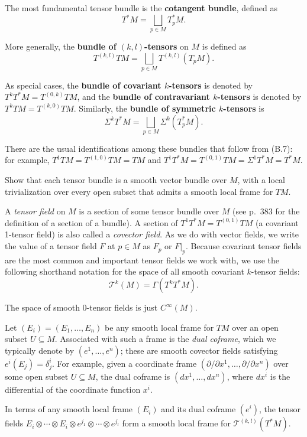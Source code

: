 The most fundamental tensor bundle is the \textbf{cotangent bundle}, defined as
\[
T^* M = \bigsqcup_{p \in M} T_p^* M.
\]

More generally, the \textbf{bundle of $(k,l)$-tensors} on $M$ is defined as
\[
T^{(k,l)} TM = \bigsqcup_{p \in M} T^{(k,l)}(T_p M).
\]

As special cases, the \textbf{bundle of covariant $k$-tensors} is denoted by $T^k T^* M = T^{(0,k)} TM$, and the \textbf{bundle of contravariant $k$-tensors} is denoted by $T^k TM = T^{(k,0)} TM$. Similarly, the \textbf{bundle of symmetric $k$-tensors} is
\[
\Sigma^k T^* M = \bigsqcup_{p \in M} \Sigma^k(T_p^* M).
\]

There are the usual identifications among these bundles that follow from (B.7): for example, $T^1 T M = T^{(1,0)} T M = T M$ and $T^1 T^* M = T^{(0,1)} T M = \Sigma^1 T^* M = T^* M$.

\begin{exercise}\label{exer:tensor-bundle-smooth-vector-bundle}
Show that each tensor bundle is a smooth vector bundle over $M$, with a local trivialization over every open subset that admits a smooth local frame for $T M$.
\end{exercise}

A \textit{tensor field} on $M$ is a section of some tensor bundle over $M$ (see p.~383 for the definition of a section of a bundle). A section of $T^1 T^* M = T^{(0,1)} T M$ (a covariant 1-tensor field) is also called a \textit{covector field}. As we do with vector fields, we write the value of a tensor field $F$ at $p \in M$ as $F_p$ or $F|_p$. Because covariant tensor fields are the most common and important tensor fields we work with, we use the following shorthand notation for the space of all smooth covariant $k$-tensor fields:
\[\mathcal{T}^k(M) = \Gamma(T^k T^* M).\]

The space of smooth 0-tensor fields is just $C^\infty(M)$.

Let $(E_i) = (E_1, \ldots, E_n)$ be any smooth local frame for $T M$ over an open subset $U \subseteq M$. Associated with such a frame is the \textit{dual coframe}, which we typically denote by $(e^1, \ldots, e^n)$; these are smooth covector fields satisfying $e^i(E_j) = \delta^i_j$. For example, given a coordinate frame $(\partial/\partial x^1, \ldots, \partial/\partial x^n)$ over some open subset $U \subseteq M$, the dual coframe is $(dx^1, \ldots, dx^n)$, where $dx^i$ is the differential of the coordinate function $x^i$.

In terms of any smooth local frame $(E_i)$ and its dual coframe $(e^i)$, the tensor fields $E_i \otimes \cdots \otimes E_i \otimes e^{j_1} \otimes \cdots \otimes e^{j_l}$ form a smooth local frame for $\mathcal{T}^{(k,l)}(T^* M)$.

